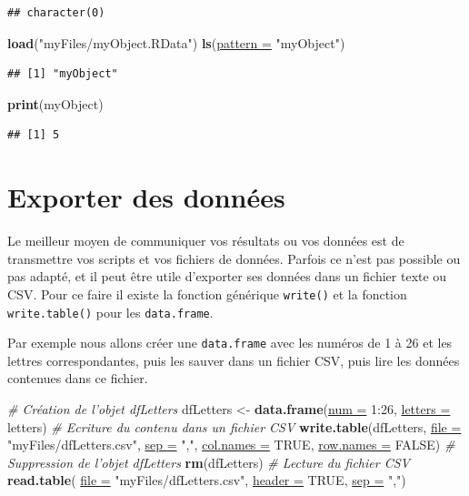 \documentclass[twoside,symmetric]{book}
\newenvironment{Shaded}{}{}
\newcommand{\CommentTok}[1]{\textit{#1}}
\newcommand{\DataTypeTok}[1]{\underline{#1}}
\newcommand{\DecValTok}[1]{#1}
\newcommand{\KeywordTok}[1]{\textbf{#1}}
\newcommand{\NormalTok}[1]{#1}
\newcommand{\OperatorTok}[1]{#1}
\newcommand{\OtherTok}[1]{#1}
\newcommand{\StringTok}[1]{#1}
\begin{document}
\begin{verbatim}
## character(0)
\end{verbatim}

\begin{Shaded}
\begin{Highlighting}[]
\KeywordTok{load}\NormalTok{(}\StringTok{"myFiles/myObject.RData"}\NormalTok{)}
\KeywordTok{ls}\NormalTok{(}\DataTypeTok{pattern =} \StringTok{"myObject"}\NormalTok{)}
\end{Highlighting}
\end{Shaded}

\begin{verbatim}
## [1] "myObject"
\end{verbatim}

\begin{Shaded}
\begin{Highlighting}[]
\KeywordTok{print}\NormalTok{(myObject)}
\end{Highlighting}
\end{Shaded}

\begin{verbatim}
## [1] 5
\end{verbatim}

\hypertarget{l016write}{%
\section{Exporter des données}\label{l016write}}

Le meilleur moyen de communiquer vos résultats ou vos données est de transmettre vos scripts et vos fichiers de données. Parfois ce n'est pas possible ou pas adapté, et il peut être utile d'exporter ses données dans un fichier texte ou CSV. Pour ce faire il existe la fonction générique \texttt{write()} et la fonction \texttt{write.table()} pour les \texttt{data.frame}.

Par exemple nous allons créer une \texttt{data.frame} avec les numéros de 1 à 26 et les lettres correspondantes, puis les sauver dans un fichier CSV, puis lire les données contenues dans ce fichier.

\begin{Shaded}
\begin{Highlighting}[]
\CommentTok{# Création de l'objet dfLetters}
\NormalTok{dfLetters <-}\StringTok{ }\KeywordTok{data.frame}\NormalTok{(}\DataTypeTok{num =} \DecValTok{1}\OperatorTok{:}\DecValTok{26}\NormalTok{, }\DataTypeTok{letters =}\NormalTok{ letters)}
\CommentTok{# Ecriture du contenu dans un fichier CSV}
\KeywordTok{write.table}\NormalTok{(dfLetters, }\DataTypeTok{file =} \StringTok{"myFiles/dfLetters.csv"}\NormalTok{, }
  \DataTypeTok{sep =} \StringTok{","}\NormalTok{, }\DataTypeTok{col.names =} \OtherTok{TRUE}\NormalTok{, }\DataTypeTok{row.names =} \OtherTok{FALSE}\NormalTok{)}
\CommentTok{# Suppression de l'objet dfLetters}
\KeywordTok{rm}\NormalTok{(dfLetters)}
\CommentTok{# Lecture du fichier CSV}
\KeywordTok{read.table}\NormalTok{(}
  \DataTypeTok{file =} \StringTok{"myFiles/dfLetters.csv"}\NormalTok{, }
  \DataTypeTok{header =} \OtherTok{TRUE}\NormalTok{, }
  \DataTypeTok{sep =} \StringTok{","}\NormalTok{)}
\end{Highlighting}
\end{Shaded}
\end{document}
